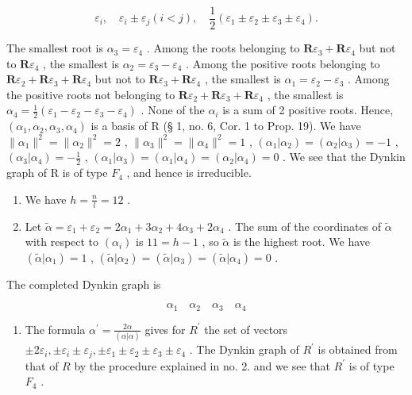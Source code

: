 \[
\varepsilon_ {i}, \quad \varepsilon_ {i} \pm \varepsilon_ {j} (i <   j), \quad \frac {1}{2} (\varepsilon_ {1} \pm \varepsilon_ {2} \pm \varepsilon_ {3} \pm \varepsilon_ {4}).
\]

The smallest root is \(\alpha_{3} = \varepsilon_{4}\) . Among the roots belonging to \(\mathbf{R}\varepsilon_{3} + \mathbf{R}\varepsilon_{4}\) but not to \(\mathbf{R}\varepsilon_{4}\) , the smallest is \(\alpha_{2} = \varepsilon_{3} - \varepsilon_{4}\) . Among the positive roots belonging to \(\mathbf{R}\varepsilon_{2} + \mathbf{R}\varepsilon_{3} + \mathbf{R}\varepsilon_{4}\) but not to \(\mathbf{R}\varepsilon_{3} + \mathbf{R}\varepsilon_{4}\) , the smallest is \(\alpha_{1} = \varepsilon_{2} - \varepsilon_{3}\) . Among the positive roots not belonging to \(\mathbf{R}\varepsilon_{2} + \mathbf{R}\varepsilon_{3} + \mathbf{R}\varepsilon_{4}\) , the smallest is \(\alpha_{4} = \frac{1}{2} (\varepsilon_{1} - \varepsilon_{2} - \varepsilon_{3} - \varepsilon_{4})\) . None of the \(\alpha_{i}\) is a sum of 2 positive roots. Hence, \((\alpha_{1},\alpha_{2},\alpha_{3},\alpha_{4})\) is a basis of R (§ 1, no. 6, Cor. 1 to Prop. 19). We have \(\| \alpha_1 \|^2 = \| \alpha_2 \|^2 = 2\) , \(\| \alpha_3 \|^2 = \| \alpha_4 \|^2 = 1\) , \((\alpha_1|\alpha_2) = (\alpha_2|\alpha_3) = -1\) , \((\alpha_3|\alpha_4) = -\frac{1}{2}\) , \((\alpha_1|\alpha_3) = (\alpha_1|\alpha_4) = (\alpha_2|\alpha_4) = 0\) . We see that the Dynkin graph of R is of type \(F_4\) , and hence is irreducible.

\begin{enumerate}
\def\labelenumi{(\Roman{enumi})}
\setcounter{enumi}{2}
\item
  We have \(h = \frac{n}{l} = 12\) .
\item
  Let \(\tilde{\alpha} = \varepsilon_1 + \varepsilon_2 = 2\alpha_1 + 3\alpha_2 + 4\alpha_3 + 2\alpha_4\) . The sum of the coordinates of \(\tilde{\alpha}\) with respect to \((\alpha_i)\) is \(11 = h - 1\) , so \(\tilde{\alpha}\) is the highest root. We have \((\tilde{\alpha}|\alpha_1) = 1\) , \((\tilde{\alpha}|\alpha_2) = (\tilde{\alpha}|\alpha_3) = (\tilde{\alpha}|\alpha_4) = 0\) .
\end{enumerate}

The completed Dynkin graph is

\[
\alpha_ {1} \quad \alpha_ {2} \quad \alpha_ {3} \quad \alpha_ {4}
\]

\begin{enumerate}
\def\labelenumi{(\Alph{enumi})}
\setcounter{enumi}{21}
\tightlist
\item
  The formula \(\alpha^{\prime} = \frac{2\alpha}{(\alpha|\alpha)}\) gives for \(R^{\prime}\) the set of vectors \(\pm 2\varepsilon_{i}, \pm \varepsilon_{i} \pm \varepsilon_{j}, \pm \varepsilon_{1} \pm \varepsilon_{2} \pm \varepsilon_{3} \pm \varepsilon_{4}\) . The Dynkin graph of \(R^{\prime}\) is obtained from that of \(R\) by the procedure explained in no. 2. and we see that \(R^{\prime}\) is of type \(F_{4}\) .
\end{enumerate}

